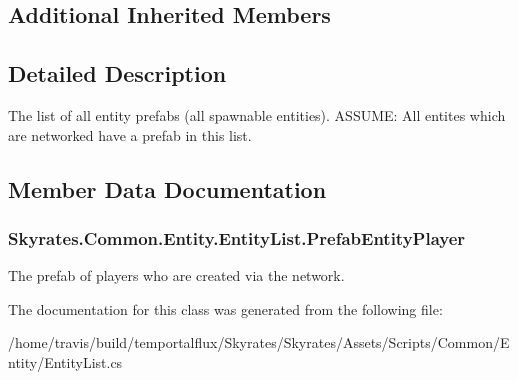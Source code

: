 \subsection*{Additional Inherited Members}


\subsection{Detailed Description}
The list of all entity prefabs (all spawnable entities). A\-S\-S\-U\-M\-E\-: All entites which are networked have a prefab in this list. 



\subsection{Member Data Documentation}
\hypertarget{class_skyrates_1_1_common_1_1_entity_1_1_entity_list_acd5f04c525f76e64706d7964bcbfceba}{
\subsubsection[{Prefab\-Entity\-Player}]{ Skyrates.\-Common.\-Entity.\-Entity\-List.\-Prefab\-Entity\-Player}}\label{class_skyrates_1_1_common_1_1_entity_1_1_entity_list_acd5f04c525f76e64706d7964bcbfceba}


The prefab of players who are created via the network. 



The documentation for this class was generated from the following file\-:\begin{DoxyCompactItemize}
\item 
/home/travis/build/temportalflux/\-Skyrates/\-Skyrates/\-Assets/\-Scripts/\-Common/\-Entity/Entity\-List.\-cs\end{DoxyCompactItemize}
